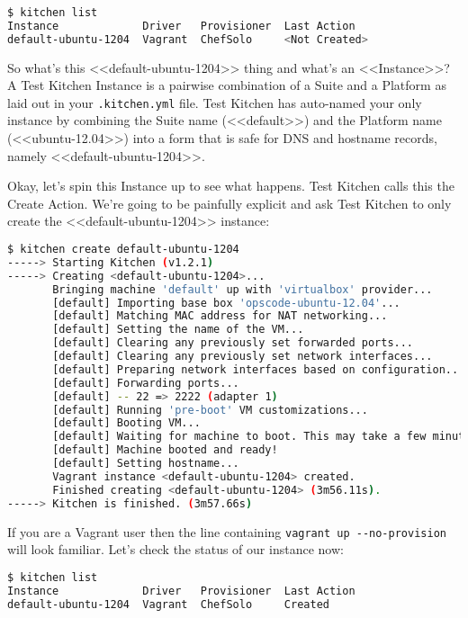 \begin{lstlisting}[language=Bash,label=lst:testing-test-kitchen6]
$ kitchen list
Instance             Driver   Provisioner  Last Action
default-ubuntu-1204  Vagrant  ChefSolo     <Not Created>
\end{lstlisting}

So what's this <<default-ubuntu-1204>> thing and what's an <<Instance>>? A Test Kitchen Instance is a pairwise combination of a Suite and a Platform as laid out in your \lstinline!.kitchen.yml! file. Test Kitchen has auto-named your only instance by combining the Suite name (<<default>>) and the Platform name (<<ubuntu-12.04>>) into a form that is safe for DNS and hostname records, namely <<default-ubuntu-1204>>.

Okay, let's spin this Instance up to see what happens. Test Kitchen calls this the Create Action. We're going to be painfully explicit and ask Test Kitchen to only create the <<default-ubuntu-1204>> instance:

\begin{lstlisting}[language=Bash,label=lst:testing-test-kitchen7]
$ kitchen create default-ubuntu-1204
-----> Starting Kitchen (v1.2.1)
-----> Creating <default-ubuntu-1204>...
       Bringing machine 'default' up with 'virtualbox' provider...
       [default] Importing base box 'opscode-ubuntu-12.04'...
       [default] Matching MAC address for NAT networking...
       [default] Setting the name of the VM...
       [default] Clearing any previously set forwarded ports...
       [default] Clearing any previously set network interfaces...
       [default] Preparing network interfaces based on configuration...
       [default] Forwarding ports...
       [default] -- 22 => 2222 (adapter 1)
       [default] Running 'pre-boot' VM customizations...
       [default] Booting VM...
       [default] Waiting for machine to boot. This may take a few minutes...
       [default] Machine booted and ready!
       [default] Setting hostname...
       Vagrant instance <default-ubuntu-1204> created.
       Finished creating <default-ubuntu-1204> (3m56.11s).
-----> Kitchen is finished. (3m57.66s)
\end{lstlisting}

If you are a Vagrant user then the line containing \lstinline!vagrant up --no-provision! will look familiar. Let's check the status of our instance now:

\begin{lstlisting}[language=Bash,label=lst:testing-test-kitchen8]
$ kitchen list
Instance             Driver   Provisioner  Last Action
default-ubuntu-1204  Vagrant  ChefSolo     Created
\end{lstlisting}

